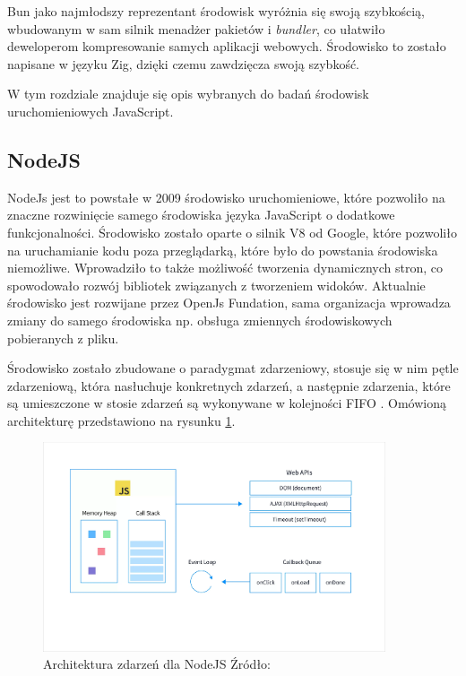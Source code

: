 Bun jako najmłodszy reprezentant środowisk wyróżnia się swoją szybkością, wbudowanym w sam silnik menadżer pakietów i \textit{bundler}, co ułatwiło deweloperom kompresowanie samych aplikacji webowych. Środowisko to zostało napisane w języku Zig, dzięki czemu zawdzięcza swoją szybkość.

W tym rozdziale znajduje się opis wybranych do badań środowisk uruchomieniowych JavaScript.

\subsection{NodeJS}
NodeJs jest to powstałe w 2009 środowisko uruchomieniowe, które pozwoliło na znaczne rozwinięcie samego środowiska języka JavaScript o dodatkowe funkcjonalności. Środowisko zostało oparte o silnik V8 od Google, które pozwoliło na uruchamianie kodu poza przeglądarką, które było do powstania środowiska niemożliwe. Wprowadziło to także możliwość tworzenia dynamicznych stron, co spowodowało rozwój bibliotek związanych z tworzeniem widoków. Aktualnie środowisko jest rozwijane przez OpenJs Fundation, sama organizacja wprowadza zmiany do samego środowiska np. obsługa zmiennych środowiskowych pobieranych z pliku.

Środowisko zostało zbudowane o paradygmat zdarzeniowy, stosuje się w nim pętle zdarzeniową, która nasłuchuje konkretnych zdarzeń, a następnie zdarzenia, które są umieszczone w stosie zdarzeń są wykonywane w kolejności FIFO \cite{event_loop}. Omówioną architekturę przedstawiono na rysunku \ref{fig:eventLoop}.

\begin{figure}[h]
  \centering
  \includegraphics[width=0.9\textwidth]{Figures/eventLoop.png}
  \caption{Architektura zdarzeń dla NodeJS Źródło: \cite{event_loop}}
  \label{fig:eventLoop}
\end{figure}

